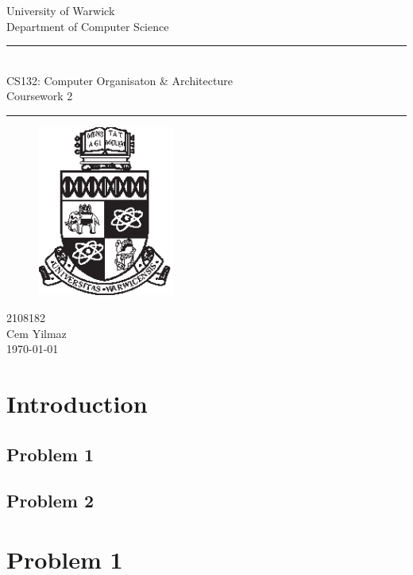 \documentclass[a4paper]{article}
\theoremstyle{plain}
\theoremstyle{definition}
\theoremstyle{remark}
\begin{document}
	\begin{titlepage}
	\begin{center}
	\large
	University of Warwick \\
	Department of Computer Science \\
	\huge
	\vspace{50mm}
	\rule{\linewidth}{0.5pt} \\
	CS132: Computer Organisaton \& Architecture \\
	\vspace{5mm}
	\Large
	Coursework 2
	\rule{\linewidth}{0.5pt}
	\vspace{5mm}
	\begin{figure}[H]
	\centering
	\includegraphics[width=0.4\textwidth]{crest_black.eps}
	\end{figure}
	\vspace{33mm}
	2108182\\
	Cem Yilmaz\\
	\today
	\end{center}
	\end{titlepage}
\tableofcontents
\newpage
\section{Introduction}
\subsection{Problem 1}

\subsection{Problem 2}
\section{Problem 1}
\end{document}
